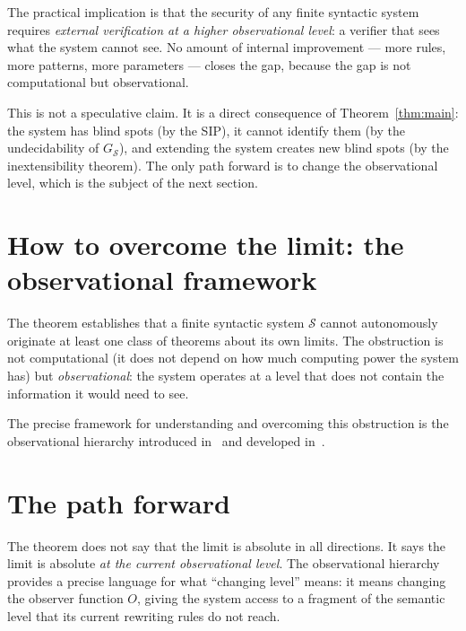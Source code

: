 \documentclass[11pt]{article}
\begin{document}
The practical implication is that the security of any finite syntactic
system requires \emph{external verification at a higher observational
level}: a verifier that sees what the system cannot see. No amount of
internal improvement --- more rules, more patterns, more parameters ---
closes the gap, because the gap is not computational but observational.

This is not a speculative claim. It is a direct consequence of
Theorem~\ref{thm:main}: the system has blind spots (by the SIP), it
cannot identify them (by the undecidability of $G_{\mathcal{S}}$), and
extending the system creates new blind spots (by the inextensibility
theorem). The only path forward is to change the observational level,
which is the subject of the next section.


\section{How to overcome the limit: the observational framework}
\label{sec:overcome}


The theorem establishes that a finite syntactic system $\mathcal{S}$
cannot autonomously originate at least one class of theorems about its
own limits. The
obstruction is not computational (it does not depend on how much
computing power the system has) but \emph{observational}: the system
operates at a level that does not contain the information it would need
to see.

The precise framework for understanding and overcoming this obstruction
is the observational hierarchy introduced in~\cite{buono2026framework} and
developed in~\cite{buono2026observer}.


\section{The path forward}

The theorem does not say that the limit is absolute in all directions.
It says the limit is absolute \emph{at the current observational level}.
The observational hierarchy provides a precise language for what
``changing level'' means: it means changing the observer function $O$,
giving the system access to a fragment of the semantic level that its
current rewriting rules do not reach.
\end{document}
